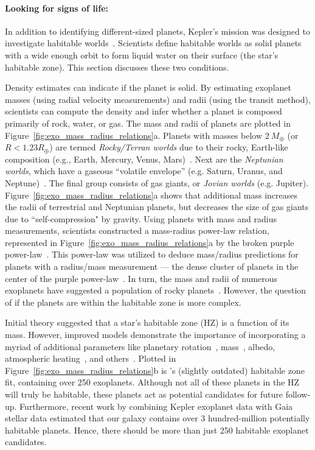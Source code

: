 \paragraph{Looking for signs of life:}
In addition to identifying different-sized planets, Kepler's mission was designed to investigate habitable worlds~\cite{kepler_mission}.
Scientists define habitable worlds as solid planets with a wide enough orbit to form liquid water on their surface (the star's habitable zone).
This section discusses these two conditions.

Density estimates can indicate if the planet is solid.
By estimating exoplanet masses (using radial velocity measurements) and radii (using the transit method), scientists can compute the density and infer whether a planet is composed primarily of rock, water, or gas.
The mass and radii of planets are plotted in Figure~\ref{fig:exo_mass_radius_relations}a. 
Planets with masses below $2\ M_{\oplus}$ (or $R < 1.23 R_{\oplus}$) are termed \textit{Rocky/Terran worlds} due to their rocky, Earth-like composition (e.g., Earth, Mercury, Venus, Mars)~\cite{Oppenheimer:2016:Sci}.
Next are the \textit{Neptunian worlds}, which have a gaseous ``volatile envelope'' (e.g. Saturn, Uranus, and Neptune)~\cite{Chen:2017:ApJ}.
The final group consists of gas giants, or \textit{Jovian worlds} (e.g. Jupiter).
Figure~\ref{fig:exo_mass_radius_relations}a shows that additional mass increases the radii of terrestrial and Neptunian planets, but decreases the size of gas giants due to ``self-compression" by gravity.
Using planets with mass and radius measurements, scientists constructed a mass-radius power-law relation, represented in Figure~\ref{fig:exo_mass_radius_relations}a by the broken purple power-law~\cite{Chen:2017:ApJ}.
This power-law was utilized to deduce mass/radius predictions for planets with a radius/mass measurement — the dense cluster of planets in the center of the purple power-law~\cite{Chen:2017:ApJ}.
In turn, the mass and radii of numerous exoplanets have suggested a population of rocky planets~\cite{kepler_mission}.
However, the question of if the planets are within the habitable zone is more complex.


Initial theory suggested that a star's habitable zone (HZ) is a function of its mass. 
However, improved models demonstrate the importance of incorporating a myriad of additional parameters like planetary rotation~\cite{Yang:2014:ApJL},  mass~\cite{Kopparapu:2014:ApJL}, albedo, atmospheric heating~\cite{Kasting:2011:AsBio}, and others~\cite{Yang:2014:ApJL, Kopparapu:2013:ApJ, Kopparapu:2014:ApJL, Shields:2014:ApJL}. 
Plotted in Figure~\ref{fig:exo_mass_radius_relations}b is \citet{Kopparapu:2014:ApJL}'s (slightly outdated) habitable zone fit, containing over 250 exoplanets.
Although not all of these planets in the HZ will truly be habitable, these planets act as potential candidates for future follow-up. 
Furthermore, recent work by 
\citet{Bryson:2021:AJ} combining Kepler exoplanet data with Gaia stellar data estimated that our galaxy contains over 3 hundred-million potentially habitable planets.
Hence, there should be more than just 250 habitable exoplanet candidates.


